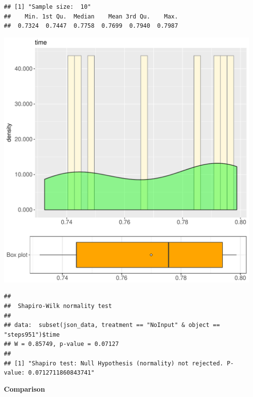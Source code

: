 \documentclass{article}\usepackage[]{graphicx}\usepackage[]{color}
\makeatletter
\def\maxwidth{ %
  \ifdim\Gin@nat@width>\linewidth
    \linewidth
  \else
    \Gin@nat@width
  \fi
}
\newenvironment{kframe}{%
 \def\at@end@of@kframe{}%
 \ifinner\ifhmode%
  \def\at@end@of@kframe{\end{minipage}}%
  \begin{minipage}{\columnwidth}%
 \fi\fi%
 \def\FrameCommand##1{\hskip\@totalleftmargin \hskip-\fboxsep
 \colorbox{shadecolor}{##1}\hskip-\fboxsep
     \hskip-\linewidth \hskip-\@totalleftmargin \hskip\columnwidth}%
 \MakeFramed {\advance\hsize-\width
   \@totalleftmargin\z@ \linewidth\hsize
   \@setminipage}}%
 {\par\unskip\endMakeFramed%
 \at@end@of@kframe}
\newenvironment{knitrout}{}{} %
\makeatother
\begin{document}
\begin{knitrout}
\color{fgcolor}\begin{kframe}
\begin{verbatim}
## [1] "Sample size:  10"
##    Min. 1st Qu.  Median    Mean 3rd Qu.    Max. 
##  0.7324  0.7447  0.7758  0.7699  0.7940  0.7987
\end{verbatim}
\end{kframe}
\includegraphics[width=\maxwidth]{figure/RH4_NoInput_steps951-1} 
\begin{kframe}\begin{verbatim}
## 
## 	Shapiro-Wilk normality test
## 
## data:  subset(json_data, treatment == "NoInput" & object == "steps951")$time
## W = 0.85749, p-value = 0.07127
## 
## [1] "Shapiro test: Null Hypothesis (normality) not rejected. P-value: 0.0712711860843741"
\end{verbatim}
\end{kframe}
\end{knitrout}
  
 \textbf{Comparison}
  
\end{document}

